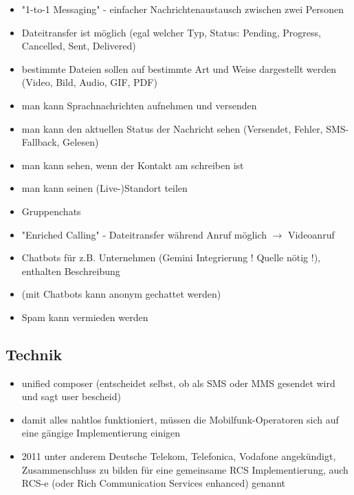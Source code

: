 \documentclass[conference]{IEEEtran}
\begin{document}
\begin{itemize}
    \item "1-to-1 Messaging" - einfacher Nachrichtenaustausch zwischen zwei Personen
    \item Dateitransfer ist möglich (egal welcher Typ, Status: Pending, Progress, Cancelled, Sent, Delivered)
    \item bestimmte Dateien sollen auf bestimmte Art und Weise dargestellt werden (Video, Bild, Audio, GIF, PDF)
    \item man kann Sprachnachrichten aufnehmen und versenden
    \item man kann den aktuellen Status der Nachricht sehen (Versendet, Fehler, SMS-Fallback, Gelesen)
    \item man kann sehen, wenn der Kontakt am schreiben ist
    \item man kann seinen (Live-)Standort teilen
    \item Gruppenchats
    \item "Enriched Calling" - Dateitransfer während Anruf möglich $\rightarrow$ Videoanruf
    \item Chatbots für z.B. Unternehmen (Gemini Integrierung ! Quelle nötig !), enthalten Beschreibung
    \item (mit Chatbots kann anonym gechattet werden)
    \item Spam kann vermieden werden
\end{itemize}
\cite{uniprof}

\subsection{Technik}

\begin{itemize}
    \item unified composer (entscheidet selbst, ob als SMS oder MMS gesendet wird und sagt user bescheid)
\end{itemize}
\cite{rcsuite}

\begin{itemize}
    \item damit alles nahtlos funktioniert, müssen die Mobilfunk-Operatoren sich auf eine gängige Implementierung einigen
    \item 2011 unter anderem Deutsche Telekom, Telefonica, Vodafone angekündigt, Zusammenschluss zu bilden für eine gemeinsame RCS Implementierung, auch RCS-e (oder Rich Communication Services enhanced) genannt
\end{itemize}
\cite{rcsmno}
\end{document}
